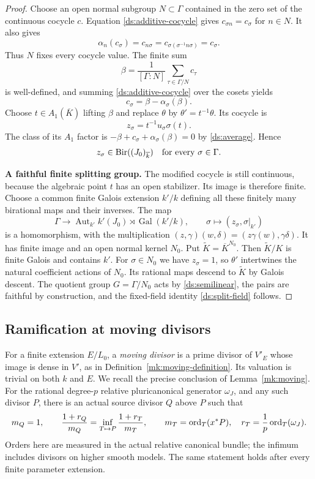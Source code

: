 \begin{proof}
Choose an open normal subgroup $N\subset\Gamma$ contained in the
zero set of the continuous cocycle $c$.  Equation
\eqref{ds:additive-cocycle} gives $c_{\sigma n}=c_\sigma$ for
$n\in N$.  It also gives
\[
 \alpha_n(c_\sigma)
 =c_{n\sigma}
 =c_{\sigma(\sigma^{-1}n\sigma)}
 =c_\sigma.
\]
Thus $N$ fixes every cocycle value.  The finite sum
\[
 \beta=\frac{1}{[\Gamma:N]}
            \sum_{\tau\in\Gamma/N}c_\tau
\]
is well-defined, and summing \eqref{ds:additive-cocycle} over the
cosets yields
\begin{equation}
 c_\sigma=\beta-\alpha_\sigma(\beta).
 \label{ds:average}
\end{equation}
Choose $t\in A_1(\overline K)$ lifting $\beta$ and replace $\theta$
by $\theta'=t^{-1}\theta$.  Its cocycle is
\[
 z_\sigma=t^{-1}u_\sigma\sigma(t).
\]
The class of its $A_1$ factor is
$-\beta+c_\sigma+\alpha_\sigma(\beta)=0$ by
\eqref{ds:average}.  Hence
\[
 z_\sigma\in\operatorname{Bir}((J_0)_{\overline k})
 \quad\text{for every }\sigma\in\Gamma.
\]

\smallskip\noindent\textbf{A faithful finite splitting group.}\enspace
The modified cocycle is still continuous, because the algebraic
point $t$ has an open stabilizer.  Its image is therefore finite.
Choose a common finite Galois extension $k'/k$ defining all these
finitely many birational maps and their inverses.  The map
\[
 \Gamma\longrightarrow
 \operatorname{Aut}_{k'} k'(J_0)
          \rtimes\operatorname{Gal}(k'/k),
 \qquad
 \sigma\longmapsto(z_\sigma,\sigma|_{k'})
\]
is a homomorphism, with the multiplication
$(z,\gamma)(w,\delta)=(z\gamma(w),\gamma\delta)$.
It has finite image and an open normal kernel $N_0$.
Put $\widetilde K=\overline K^{N_0}$.  Then
$\widetilde K/K$ is finite Galois and contains $k'$.  For
$\sigma\in N_0$ we have $z_\sigma=1$, so $\theta'$ intertwines the
natural coefficient actions of $N_0$.  Its rational maps descend
to $\widetilde K$ by Galois descent.  The quotient group
$G=\Gamma/N_0$ acts by \eqref{ds:semilinear}, the pairs are
faithful by construction, and the fixed-field identity
\eqref{ds:split-field} follows.
\end{proof}

\subsection{Ramification at moving divisors}

For a finite extension $E/L_0$, a \emph{moving divisor} is a prime
divisor of $V'_E$ whose image is dense in $V'$, as in
Definition~\ref{mk:moving-definition}. Its valuation is trivial
on both $k$ and $E$. We recall the precise conclusion of
Lemma~\ref{mk:moving}.  For the rational degree-$p$ relative
pluricanonical generator $\omega_J$, and any such divisor $P$, there
is an actual source divisor $Q$ above $P$ such that
\begin{equation}
 m_Q=1,
 \qquad
 \frac{1+r_Q}{m_Q}
   =\inf_{T\mapsto P}\frac{1+r_T}{m_T},
 \qquad
 m_T=\operatorname{ord}_T(x^*P),\quad
 r_T=\frac{1}{p}\operatorname{ord}_T(\omega_J).
 \label{ds:threshold}
\end{equation}
Orders here are measured in the actual relative canonical bundle;
the infimum includes divisors on higher smooth models.  The same
statement holds after every finite parameter extension.

